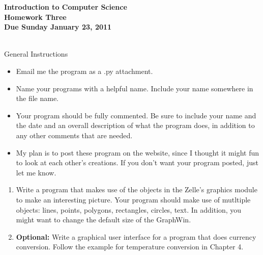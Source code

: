 \documentclass[12pt]{article}
\begin{document}
\pagestyle{empty}
 
\begin{center}
{\large {\bf Introduction to Computer Science}}\\
\medskip
{\large {\bf Homework Three}}\\
\medskip
{ {\bf Due Sunday January 23, 2011}}\\ 
\end{center}

\hspace{2mm}\\

\noindent General Instructions

\begin{itemize}
\setlength{\itemsep}{-1mm}
  \item Email me the program as a .py attachment.
  \item Name your programs with a helpful name.  Include your name
    somewhere in the file name.
  \item Your program should be fully commented.  Be sure to include
    your name and the date and an overall description of what the
    program does, in addition to any other comments that are needed. 
  \item My plan is to post these program on the website, since I
    thought it might fun to look at each other's creations.  If you
    don't want your program posted, just let me know. 
\end{itemize}


\begin{enumerate}

\item Write a program that makes use of the objects in the Zelle's
  graphics module to make an interesting picture.  Your program should
  make use of mutltiple objects: lines, points, polygons, rectangles,
  circles, text.  In addition, you might want to change the default
  size of the GraphWin.  

\item {\bf Optional:} Write a graphical user interface for a program
  that does currency conversion.  Follow the example for temperature
  conversion in Chapter 4.

\end{enumerate}
\end{document}

